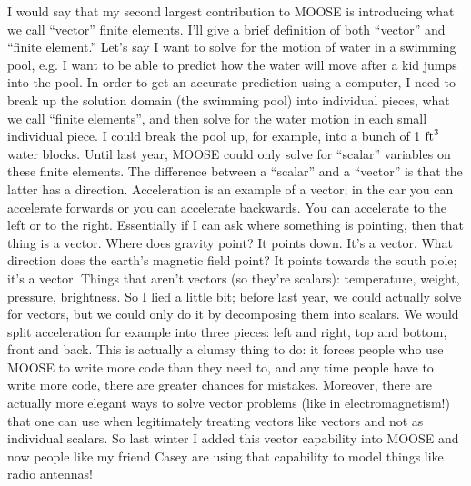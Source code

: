 \documentclass[11pt]{article}
\begin{document}
I would say that my second largest contribution to MOOSE is introducing what we
call ``vector'' finite elements. I'll give a brief definition of both ``vector''
and ``finite element.'' Let's say I want to solve for the motion of water in a
swimming pool, e.g. I want to be able to predict how the water will move after a
kid jumps into the pool. In order to get an accurate prediction using a
computer, I need to break up the solution domain (the swimming pool) into
individual pieces, what we call ``finite elements'', and then solve for the
water motion in each small individual piece. I could break the pool up, for
example, into a bunch of 1 $\rm{ft}^3$ water blocks. Until last year, MOOSE
could only solve for ``scalar'' variables on these finite elements. The
difference between a ``scalar'' and a ``vector'' is that the latter has a
direction. Acceleration is an example of a vector; in the car you can accelerate
forwards or you can accelerate backwards. You can accelerate to the left or to
the right. Essentially if I can ask where something is pointing, then that thing
is a vector. Where does gravity point? It points down. It's a vector. What
direction does the earth's magnetic field point? It points towards the
south pole; it's a vector. Things that aren't vectors (so they're scalars):
temperature, weight, pressure, brightness. So I lied a little bit; before last
year, we could actually solve for vectors, but we could only do it by
decomposing them into scalars. We would split acceleration for example into
three pieces: left and right, top and bottom, front and back. This is actually a
clumsy thing to do: it forces people who use MOOSE to write more code than they
need to, and any time people have to write more code, there are greater chances
for mistakes. Moreover, there are actually more elegant ways to solve vector
problems (like in electromagnetism!) that one can use when legitimately treating
vectors like vectors and not as individual scalars. So last winter I added this
vector capability into MOOSE and now people like my friend Casey are using that
capability to model things like radio antennas!
\end{document}
